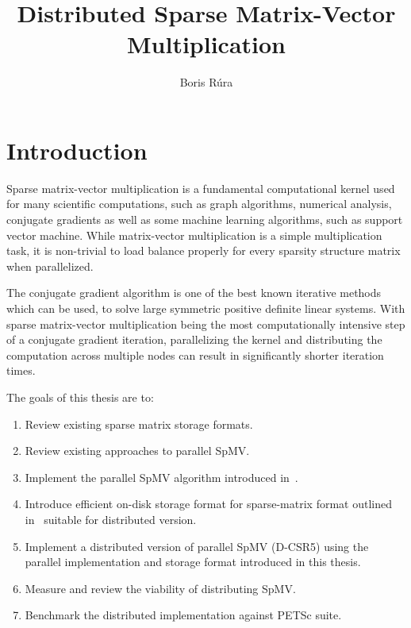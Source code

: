 \documentclass[thesis=M,english]{FITthesis}[2019/12/23]
\title{Distributed Sparse Matrix-Vector Multiplication}
\author{Boris Rúra} %
\begin{document}
\tableofcontents

\chapter{Introduction}

Sparse matrix-vector multiplication is a fundamental computational kernel used for many
scientific computations, such as graph algorithms, numerical analysis, conjugate gradients
as well as some machine learning algorithms, such as support vector machine.
While matrix-vector multiplication is a simple multiplication task, it is non-trivial to load balance
properly for every sparsity structure matrix when parallelized.

The conjugate gradient algorithm is one of the best known iterative methods which can be used, to solve large
symmetric positive definite linear systems. With sparse matrix-vector multiplication being the most
computationally intensive step of a conjugate gradient iteration, parallelizing the kernel and distributing
the computation across multiple nodes can result in significantly shorter iteration times.

The goals of this thesis are to:

\begin{enumerate}
    \item Review existing sparse matrix storage formats.
    \item Review existing approaches to parallel SpMV\@.
    \item Implement the parallel SpMV algorithm introduced in~\cite{liu2015csr5}.
    \item Introduce efficient on-disk storage format for sparse-matrix format outlined
          in~\cite{liu2015csr5} suitable for distributed version.
    \item Implement a distributed version of parallel SpMV (D-CSR5) using the parallel implementation
          and storage format introduced in this thesis.
    \item Measure and review the viability of distributing SpMV\@.
    \item Benchmark the distributed implementation against PETSc suite.
\end{enumerate}



\end{document}
